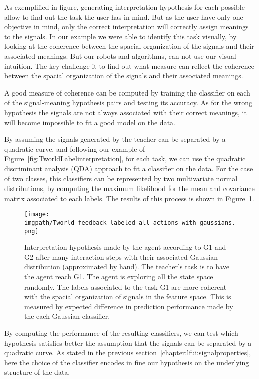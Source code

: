 As exemplified in figure, generating interpretation hypothesis for each possible allow to find out the task the user has in mind. But as the user have only one objective in mind, only the correct interpretation will correctly assign meanings to the signals. In our example we were able to identify this task visually, by looking at the coherence between the spacial organization of the signals and their associated meanings. But our robots and algorithms, can not use our visual intuition. The key challenge it to find out what measure can reflect the coherence between the spacial organization of the signals and their associated meanings.

A good measure of coherence can be computed by training the classifier on each of the signal-meaning hypothesis pairs and testing its accuracy. As for the wrong hypothesis the signals are not always associated with their correct meanings, it will become impossible to fit a good model on the data. 

By assuming the signals generated by the teacher can be separated by a quadratic curve, and following our example of Figure~\ref{fig:TworldLabelinterpretation}, for each task, we can use the  quadratic discriminant analysis (QDA) \cite{lachenbruch1975discriminant} approach to fit a classifier on the data. For the case of two classes, this classifiers can be represented by two multivariate normal distributions, by  computing the maximum likelihood for the mean and covariance matrix associated to each labels. The results of this process is shown in Figure~\ref{fig:TworldLabelGaussian}.

\begin{figure}[!ht]
    \centering
    \texttt{[image: \\imgpath/Tworld\_feedback\_labeled\_all\_actions\_with\_gaussians.png]}
    \caption{Interpretation hypothesis made by the agent according to G1 and G2 after many interaction steps with their associated Gaussian distribution (approximated by hand). The teacher's task is to have the agent reach G1. The agent is exploring all the state space randomly. The labels associated to the task G1 are more coherent with the spacial organization of signals in the feature space. This is measured by expected difference in prediction performance made by the each Gaussian classifier.}
    \label{fig:TworldLabelGaussian}
\end{figure}

By computing the performance of the resulting classifiers, we can test which hypothesis satisfies better the assumption that the signals can be separated by a quadratic curve. As stated in the previous section~\ref{chapter:lfui:signalproperties}, here the choice of the classifier encodes in fine our hypothesis on the underlying structure of the data.

